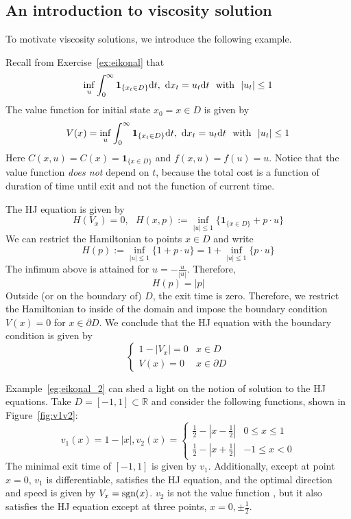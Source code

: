 \documentclass[11pt]{book}
\providecommand{\mathds}[1]{\mathbf{#1}}
\newcommand{\dt}{\text{\normalfont d}t}
\newcommand{\dx}{\text{\normalfont d}x}
\begin{document}
\subsection{An introduction to viscosity solution}
To motivate viscosity solutions, we introduce the following example.
\begin{eg}
\label{eg:eikonal_2}
    Recall from Exercise~\ref{ex:eikonal} that
    \[
        \inf_u\int_0^\infty \mathds{1}_{\{x_t\in D\}}{\dt},~{\dx}_t=u_t{\dt}~\text{ with }~|u_t|\le1
    \]
    The value function for initial state $x_0=x\in D$ is given by
    \[
        V(x)=\inf_u\int_0^\infty \mathds{1}_{\{x_t\in D\}}{\dt},~{\dx}_t=u_t{\dt}~\text{ with }~|u_t|\le1
    \]
    Here $C(x,u)=C(x)=\mathds{1}_{\{x\in D\}}$ and $f(x,u)=f(u)=u$.
    Notice that the value function \emph{does not} depend on $t$, because the total cost is a function of duration of time until exit and not the function of current time.

    The HJ equation is given by
    \[
    H(V_x)=0,~~~H(x,p):=\inf_{|u|\le1}\{\mathds{1}_{\{x\in D\}}+p\cdot u\}
    \]
    We can restrict the Hamiltonian to points $x\in D$ and write 
    \[
    H(p):=\inf_{|u|\le1}\{1+p\cdot u\}=1+\inf_{|u|\le1}\{p\cdot u\}
    \]
    The infimum above is attained for $u=-\frac{u}{|u|}$. Therefore,
    \[
    H(p)=|p|
    \]
    Outside (or on the boundary of) $D$, the exit time is zero. Therefore, we restrict the Hamiltonian to inside of the domain and impose the boundary condition $V(x)=0$ for $x\in\partial D$. We conclude that the HJ equation with the boundary condition is given by
    \[
    \begin{cases}
        1-|V_x|=0&x\in D\\
        V(x)=0&x\in \partial D
    \end{cases}
    \]
\end{eg}
Example~\ref{eg:eikonal_2} can shed a light on the notion of solution to the HJ equations. Take $D=[-1,1]\subset \mathbb{R}$ and consider the following functions,  shown in Figure~\ref{fig:v1v2}:
        \[
        v_1(x) = 1-|x|, v_2(x)= \begin{cases}
            \frac12-|x-\frac12|&0\le x\le1\\
            \frac12-|x+\frac12|&-1\le x<0
        \end{cases}
        \]
The minimal exit time of $[-1,1]$ is given by $v_1$. Additionally, except at point $x=0$, $v_1$ is differentiable, satisfies the HJ equation, and the optimal direction and speed is given by $V_x=\text{\normalfont sgn}(x)$. $v_2$ is not the value function  , but it also satisfies the HJ equation except at three points, $x=0,\pm\frac12$. 
\end{document}
